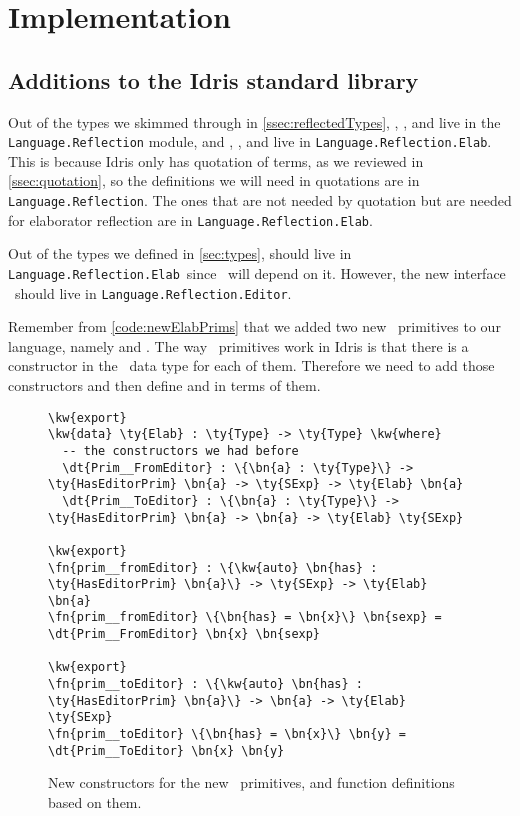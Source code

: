 \chapter{Implementation}\label{chap:implementation}

\section{Additions to the Idris standard library}\label{sec:stdlib}

\newcommand{\LR}{\texttt{Language.Reflection}}
\newcommand{\LRE}{\texttt{Language.Reflection.Elab}}
\newcommand{\LREd}{\texttt{Language.Reflection.Editor}}

Out of the types we skimmed through in \autoref{ssec:reflectedTypes}, \TT,
\Raw, and  live in the \texttt{Language.Reflection} module, and
, , and  live in \LRE. This is because
Idris only has quotation of terms, as we reviewed in \autoref{ssec:quotation},
so the definitions we will need in quotations are in \LR. The ones that are not
needed by quotation but are needed for elaborator reflection are in \LRE.

Out of the types we defined in \autoref{sec:types},  should live in
\LRE\ since \Elab\ will depend on it. However, the new interface
\Editorable\ should live in \LREd.

Remember from \autoref{code:newElabPrims} that we added two new
\Elab\ primitives to our language, namely  and
.
The way \Elab\ primitives work in Idris is that there is a constructor in the
\Elab\ data type for each of them. Therefore we need to add those constructors
and then define  and  in terms of
them.

\begin{figure}[ht]
\caption{New constructors for the new \Elab\ primitives, and function definitions based on them.}
  \label{code:newElabConstructors}
\begin{Verbatim}[framesep=2mm, label=\footnotesize{\normalfont{Idris}}, labelposition=topline]
\kw{export}
\kw{data} \ty{Elab} : \ty{Type} -> \ty{Type} \kw{where}
  -- the constructors we had before
  \dt{Prim__FromEditor} : \{\bn{a} : \ty{Type}\} -> \ty{HasEditorPrim} \bn{a} -> \ty{SExp} -> \ty{Elab} \bn{a}
  \dt{Prim__ToEditor} : \{\bn{a} : \ty{Type}\} -> \ty{HasEditorPrim} \bn{a} -> \bn{a} -> \ty{Elab} \ty{SExp}

\kw{export}
\fn{prim__fromEditor} : \{\kw{auto} \bn{has} : \ty{HasEditorPrim} \bn{a}\} -> \ty{SExp} -> \ty{Elab} \bn{a}
\fn{prim__fromEditor} \{\bn{has} = \bn{x}\} \bn{sexp} = \dt{Prim__FromEditor} \bn{x} \bn{sexp}

\kw{export}
\fn{prim__toEditor} : \{\kw{auto} \bn{has} : \ty{HasEditorPrim} \bn{a}\} -> \bn{a} -> \ty{Elab} \ty{SExp}
\fn{prim__toEditor} \{\bn{has} = \bn{x}\} \bn{y} = \dt{Prim__ToEditor} \bn{x} \bn{y}
\end{Verbatim}
\end{figure}

